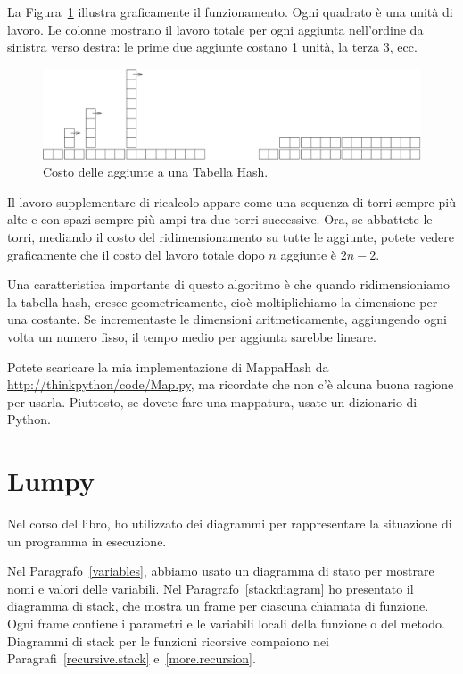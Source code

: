 \documentclass[10pt]{book}
\begin{document}
La Figura~\ref{fig.hash} illustra graficamente il funzionamento. Ogni quadrato è una unità di lavoro. Le colonne mostrano il lavoro totale per ogni aggiunta nell'ordine da sinistra verso destra: le prime due aggiunte costano 1 unità, la terza 3, ecc.

\begin{figure}
\centerline{\includegraphics[scale=0.6]{figs/towers.pdf}}
\caption{Costo delle aggiunte a una Tabella Hash.\label{fig.hash}}
\end{figure}

Il lavoro supplementare di ricalcolo appare come una sequenza di torri sempre più alte e con spazi sempre più ampi tra due torri successive. Ora, se abbattete le torri, mediando il costo del ridimensionamento su tutte le aggiunte, potete vedere graficamente che il costo del lavoro totale dopo $n$ aggiunte è $2n - 2$.

Una caratteristica importante di questo algoritmo è che quando ridimensioniamo la tabella hash, cresce geometricamente, cioè moltiplichiamo la dimensione per una costante. Se incrementaste le dimensioni aritmeticamente, aggiungendo ogni volta un numero fisso, il tempo medio per aggiunta sarebbe lineare.

Potete scaricare la mia implementazione di MappaHash da
\url{http://thinkpython/code/Map.py}, ma ricordate che non c'è alcuna buona ragione per usarla. Piuttosto, se dovete fare una mappatura, usate un dizionario di Python.






\chapter{Lumpy}
\label{lumpy}

Nel corso del libro, ho utilizzato dei diagrammi per rappresentare la situazione di un programma in esecuzione.

Nel Paragrafo~\ref{variables}, abbiamo usato un diagramma di stato per mostrare nomi e valori delle variabili.  Nel Paragrafo~\ref{stackdiagram} ho presentato il diagramma di stack, che mostra un frame per ciascuna chiamata di funzione. Ogni frame contiene i parametri e le variabili locali della funzione o del metodo. Diagrammi di stack per le funzioni ricorsive compaiono nei Paragrafi~\ref{recursive.stack} e~\ref{more.recursion}.
\end{document}
